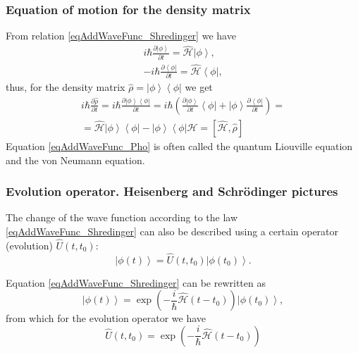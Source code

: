 \subsubsection{Equation of motion for the density matrix}
From relation \eqref{eqAddWaveFunc_Shredinger} we have
\begin{eqnarray}
i \hbar \frac{\partial \left| \phi \right>}{\partial t} = \hat{\mathcal{H}}
\left| \phi \right>,
\nonumber \\
- i \hbar \frac{\partial \left< \phi \right|}{\partial t} = \hat{\mathcal{H}}
\left< \phi \right|,
\nonumber
\end{eqnarray}
thus, for the density matrix 
$\hat{\rho} = \left| \phi \right>\left< \phi \right|$ we get
\begin{eqnarray}
i \hbar \frac{\partial \hat{\rho} }{\partial t} = 
i \hbar \frac{\partial  \left| \phi \right>\left< \phi \right|
}{\partial t} = 
i \hbar \left( \frac{\partial \left| \phi \right>}{\partial t}\left< \phi
\right| +
\left| \phi \right> \frac{\partial \left< \phi \right|}{\partial t}
\right) =
\nonumber \\
=  \hat{\mathcal{H}} \left| \phi \right>\left< \phi \right| -
\left| \phi \right>\left< \phi \right|\hat{\mathcal{H}} = 
\left[ \hat{\mathcal{H}}, \hat{\rho} \right]
\label{eqAddWaveFunc_Pho}
\end{eqnarray}
Equation \eqref{eqAddWaveFunc_Pho} is often called the quantum
Liouville equation and the von Neumann equation.

\subsubsection{Evolution operator. Heisenberg and Schrödinger pictures}

The change of the wave function according to the law \eqref{eqAddWaveFunc_Shredinger}
can also be described using a certain operator (evolution) $\hat{U}\left(t,t_0\right)$:
\begin{equation}
\left| \phi\left(t\right) \right> = 
\hat{U}\left(t,t_0\right)\left| \phi\left(t_0\right) \right>.
\label{eqAddWaveFunc_ShredingerU}
\end{equation}

Equation \eqref{eqAddWaveFunc_Shredinger} can be rewritten as
\begin{equation}
\left| \phi\left(t\right) \right> = 
\exp\left( -\frac{i}{\hbar} \hat{\mathcal{H}} \left( t - t_0 \right)  \right)
\left| \phi\left(t_0\right) \right>,
\nonumber
\end{equation}
from which for the evolution operator we have
\begin{equation}
\hat{U}\left(t,t_0\right) = 
\exp\left( -\frac{i}{\hbar} \hat{\mathcal{H}} \left( t - t_0 \right)  \right)
\label{eqAddDiracEvolutionOper}
\end{equation}

